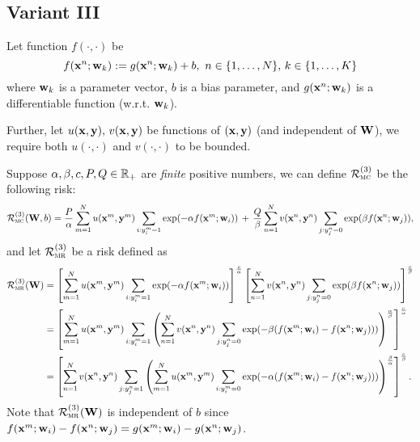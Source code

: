 \subsection{Variant III}

Let function $f(\cdot, \cdot)$ be
\begin{equation*}
f(\mathbf{x}^n; \mathbf{w}_k) := g(\mathbf{x}^n; \mathbf{w}_k) + b, \ n \in \{1,\dots,N\}, \, k \in \{1,\dots,K\}
\end{equation*}
where $\mathbf{w}_k$ is a parameter vector, $b$ is a bias parameter, 
and $g(\mathbf{x}^n; \mathbf{w}_k)$ is a differentiable function (w.r.t. $\mathbf{w}_k$).

Further, let $u(\mathbf{x}, \mathbf{y}), \, v(\mathbf{x}, \mathbf{y})$ be functions of $(\mathbf{x}, \mathbf{y})$ (and independent of $\mathbf{W}$), 
we require both $u(\cdot,\cdot)$ and $v(\cdot,\cdot)$ to be bounded.

Suppose $\alpha, \beta, c, P, Q \in \mathbb{R}_+$ are \emph{finite} positive numbers, 
we can define $\mathcal{R}_\textsc{mc}^{({3})}$ be the following risk:
\begin{equation}
\label{eq:mc}
\displaystyle
\mathcal{R}_\textsc{mc}^{({3})}(\mathbf{W}, b) 
= \frac{P}{\alpha} \sum_{m=1}^N u(\mathbf{x}^m, \mathbf{y}^m) \sum_{i: y_i^m = 1} \exp(-\alpha f(\mathbf{x}^m; \mathbf{w}_i)) \, + \,
  \frac{Q}{\beta}  \sum_{n=1}^N v(\mathbf{x}^n, \mathbf{y}^n) \sum_{j: y_j^n = 0} \exp( \beta  f(\mathbf{x}^n; \mathbf{w}_j)),
\end{equation}
and let $\mathcal{R}_\textsc{mr}^{({3})}$ be a risk defined as
\begin{equation}
\label{eq:mr}
\begin{aligned}
\displaystyle
\mathcal{R}_\textsc{mr}^{({3})}(\mathbf{W}) 
&= \left[ \sum_{m=1}^N u(\mathbf{x}^m, \mathbf{y}^m) \sum_{i: y_i^m = 1} \exp(-\alpha f(\mathbf{x}^m; \mathbf{w}_i)) \right]^\frac{c}{\alpha}
   \left[ \sum_{n=1}^N v(\mathbf{x}^n, \mathbf{y}^n) \sum_{j: y_j^n = 0} \exp( \beta  f(\mathbf{x}^n; \mathbf{w}_j)) \right]^\frac{c}{\beta} \\
&= \left[ \sum_{m=1}^N u(\mathbf{x}^m, \mathbf{y}^m) \sum_{i: y_i^m = 1} \left( \sum_{n=1}^N v(\mathbf{x}^n, \mathbf{y}^n) \sum_{j: y_j^n = 0}
   \exp(-\beta(f(\mathbf{x}^m; \mathbf{w}_i) - f(\mathbf{x}^n; \mathbf{w}_j))) \right)^\frac{\alpha}{\beta} \right]^\frac{c}{\alpha} \\
&= \left[ \sum_{n=1}^N v(\mathbf{x}^n, \mathbf{y}^n) \sum_{j: y_j^n = 1} \left( \sum_{m=1}^N u(\mathbf{x}^m, \mathbf{y}^m) \sum_{i: y_i^m = 0}
   \exp(-\alpha(f(\mathbf{x}^m; \mathbf{w}_i) - f(\mathbf{x}^n; \mathbf{w}_j))) \right)^\frac{\beta}{\alpha} \right]^\frac{c}{\beta}.
\end{aligned}
\end{equation}
Note that $\mathcal{R}_\textsc{mr}^{({3})}(\mathbf{W})$ is independent of $b$ since 
$f(\mathbf{x}^m; \mathbf{w}_i) - f(\mathbf{x}^n; \mathbf{w}_j) = g(\mathbf{x}^m; \mathbf{w}_i) - g(\mathbf{x}^n; \mathbf{w}_j)$.



